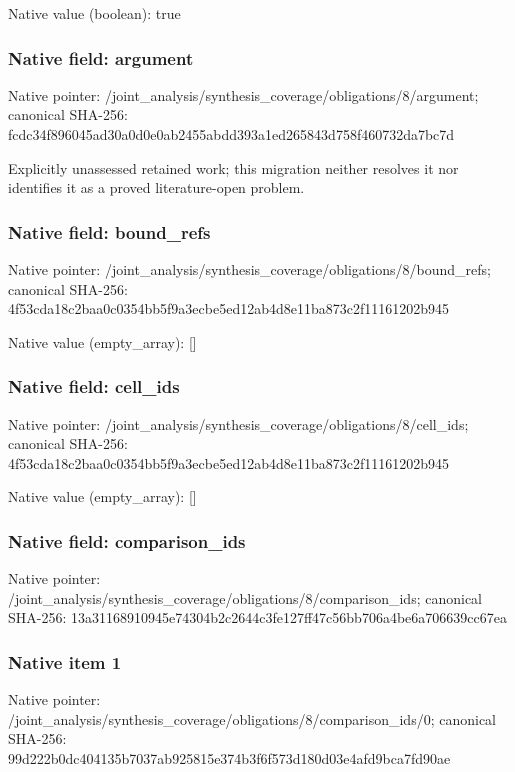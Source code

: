 \documentclass[10pt,a4paper]{article}
\begin{document}
Native value (boolean): true

\subsubsection{Native field: argument}
Native pointer: /joint\_\allowbreak{}analysis/synthesis\_\allowbreak{}coverage/obligations/8/argument; canonical SHA-256: fcdc34f896045ad30a0d0e0ab2455abdd393a1ed265843d758f460732da7bc7d

\begingroup\raggedright\sloppy Explicitly unassessed retained work;\allowbreak{} this migration neither resolves it nor identifies it as a proved literature-open problem.\par\endgroup

\subsubsection{Native field: bound\_\allowbreak{}refs}
Native pointer: /joint\_\allowbreak{}analysis/synthesis\_\allowbreak{}coverage/obligations/8/bound\_\allowbreak{}refs; canonical SHA-256: 4f53cda18c2baa0c0354bb5f9a3ecbe5ed12ab4d8e11ba873c2f11161202b945

Native value (empty\_\allowbreak{}array): []

\subsubsection{Native field: cell\_\allowbreak{}ids}
Native pointer: /joint\_\allowbreak{}analysis/synthesis\_\allowbreak{}coverage/obligations/8/cell\_\allowbreak{}ids; canonical SHA-256: 4f53cda18c2baa0c0354bb5f9a3ecbe5ed12ab4d8e11ba873c2f11161202b945

Native value (empty\_\allowbreak{}array): []

\subsubsection{Native field: comparison\_\allowbreak{}ids}
Native pointer: /joint\_\allowbreak{}analysis/synthesis\_\allowbreak{}coverage/obligations/8/comparison\_\allowbreak{}ids; canonical SHA-256: 13a31168910945e74304b2c2644c3fe127ff47c56bb706a4be6a706639cc67ea

\subsubsection{Native item 1}
Native pointer: /joint\_\allowbreak{}analysis/synthesis\_\allowbreak{}coverage/obligations/8/comparison\_\allowbreak{}ids/0; canonical SHA-256: 99d222b0dc404135b7037ab925815e374b3f6f573d180d03e4afd9bca7fd90ae
\end{document}
